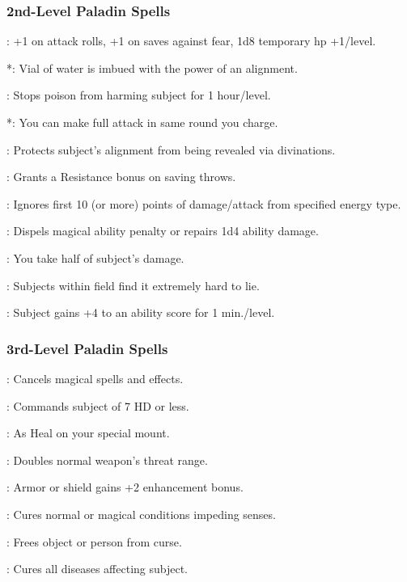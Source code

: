 \subsubsection{2nd-Level Paladin Spells}
\begin{list}{}{\leftmargin=1em}
\item {}: +1 on attack rolls, +1 on saves against fear, 1d8 temporary hp +1/level.
\item {}*: Vial of water is imbued with the power of an alignment.
\item {}: Stops poison from harming subject for 1 hour/level.
\item {}*: You can make full attack in same round you charge.
\item {}: Protects subject's alignment from being revealed via divinations.
\item {}: Grants a Resistance bonus on saving throws.
\item {}: Ignores first 10 (or more) points of damage/attack from specified energy type.
\item {}: Dispels magical ability penalty or repairs 1d4 ability damage.
\item {}: You take half of subject's damage.
\item {}: Subjects within field find it extremely hard to lie.
\item {}: Subject gains +4 to an ability score for 1 min./level.
\end{list}
\subsubsection{3rd-Level Paladin Spells}
\begin{list}{}{\leftmargin=1em}
 \item {}: Cancels magical spells and effects.
 \item {}: Commands subject of 7 HD or less.
 \item {}: As Heal on your special mount.
 \item {}: Doubles normal weapon's threat range.
 \item {}: Armor or shield gains +2 enhancement bonus.
 \item {}: Cures normal or magical conditions impeding senses.
 \item {}: Frees object or person from curse.
 \item {}: Cures all diseases affecting subject.
\end{list}
